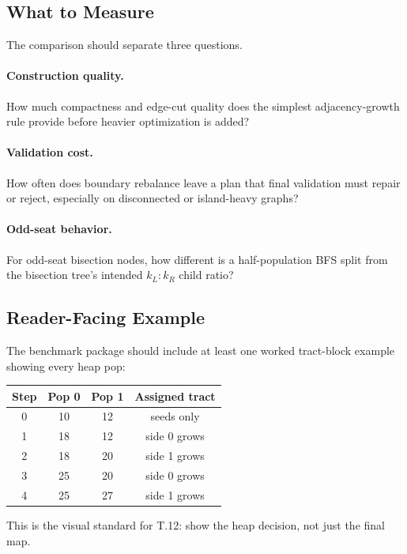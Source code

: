 \subsection{What to Measure}

The comparison should separate three questions.

\paragraph{Construction quality.}
How much compactness and edge-cut quality does the simplest adjacency-growth
rule provide before heavier optimization is added?

\paragraph{Validation cost.}
How often does boundary rebalance leave a plan that final validation must
repair or reject, especially on disconnected or island-heavy graphs?

\paragraph{Odd-seat behavior.}
For odd-seat bisection nodes, how different is a half-population BFS split from
the bisection tree's intended $k_L:k_R$ child ratio?

\subsection{Reader-Facing Example}

The benchmark package should include at least one worked tract-block example
showing every heap pop:

\begin{center}
\begin{tabular}{c@{\quad}c@{\quad}c@{\quad}c}
\textbf{Step} & \textbf{Pop 0} & \textbf{Pop 1} & \textbf{Assigned tract} \\
\hline
0 & 10 & 12 & seeds only \\
1 & 18 & 12 & side 0 grows \\
2 & 18 & 20 & side 1 grows \\
3 & 25 & 20 & side 0 grows \\
4 & 25 & 27 & side 1 grows \\
\end{tabular}
\end{center}

This is the visual standard for T.12: show the heap decision, not just the final
map.
